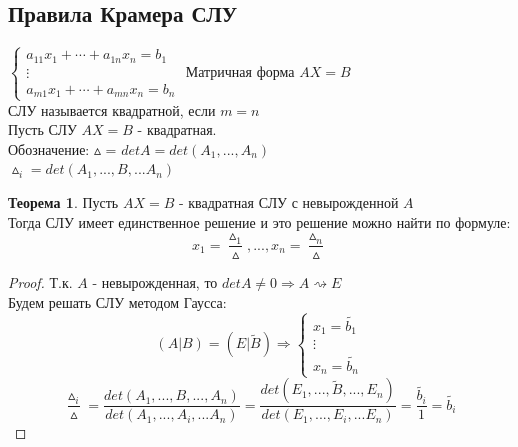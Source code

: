 \documentclass[a4paper, 12pt]{article}
\theoremstyle{definition}
\newtheorem*{theorem}{Теорема}
\begin{document}
  \subsection{Правила Крамера СЛУ}
  $\begin{cases}
    a_{11}x_1 + \cdots + a_{1n}x_n = b_1 \\
    \vdots \\ 
    a_{m1}x_1 + \cdots + a_{mn}x_n = b_n 
  \end{cases}$
  Матричная форма $AX=B$ \\ 
  СЛУ называется квадратной, если $m=n$ \\
  Пусть СЛУ $AX=B$  - квадратная. \\
  Обозначение: $\vartriangle$ = $detA = det(A_1,...,A_n)$\\
  $\vartriangle_i = det(A_1,...,B,...A_n)$
  \begin{theorem}
    Пусть $AX = B$ - квадратная СЛУ с невырожденной $A$ \\
    Тогда СЛУ имеет единственное решение и это решение можно найти по формуле:
    $$x_1 = \frac{\vartriangle_1}{\vartriangle },...,x_n = \frac{\vartriangle_n}{\vartriangle }$$  
  \end{theorem} 
  \begin{proof}
    Т.к. $A$ - невырожденная, то $detA \not = 0 \Longrightarrow A\rightsquigarrow E$\\
    Будем решать СЛУ методом Гаусса:
    $$(A|B) = (E|\widetilde{B}
    ) \Longrightarrow \begin{cases}
      x_1 = \widetilde{b_1}\\
      \vdots \\
      x_n = \widetilde{b_n}
    \end{cases}$$
    $$\frac{\vartriangle_i}{\vartriangle } = \frac{det(A_1,...,B,...,A_n)}{det(A_1,...,A_i,...A_n)} = \frac{det(E_1,...,\widetilde{B},...,E_n)}{det(E_1,...,E_i,...E_n)} = \frac{\widetilde{b_i}}{1} = \widetilde{b_i}$$  
  \end{proof} 
\end{document}
